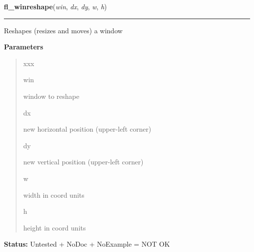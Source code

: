\hspace{.8\funcindent}\begin{boxedminipage}{\funcwidth}

    \raggedright \textbf{fl\_winreshape}(\textit{win}, \textit{dx}, \textit{dy}, \textit{w}, \textit{h})

    \vspace{-1.5ex}

    \rule{\textwidth}{0.5\fboxrule}
\setlength{\parskip}{2ex}
    Reshapes (resizes and moves) a window

\setlength{\parskip}{1ex}
      \textbf{Parameters}
      \vspace{-1ex}

      \begin{quote}
        \begin{Ventry}{xxx}

          \item[win]

          window to reshape

          \item[dx]

          new horizontal position (upper-left corner)

          \item[dy]

          new vertical position (upper-left corner)

          \item[w]

          width in coord units

          \item[h]

          height in coord units

        \end{Ventry}

      \end{quote}

\textbf{Status:} Untested + NoDoc + NoExample = NOT OK



    \end{boxedminipage}

    \label{xformslib:library:fl_winicon}

    \vspace{0.5ex}

